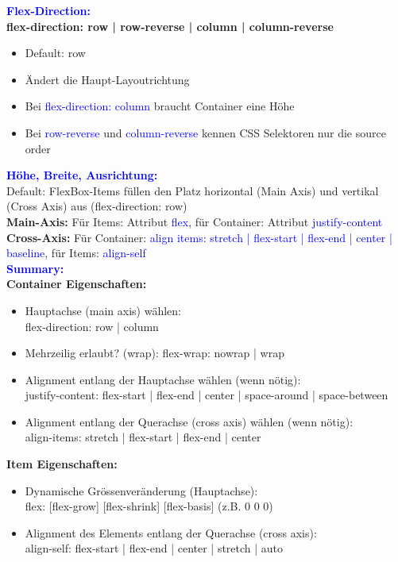 \textbf{\textcolor{blue}{Flex-Direction:}}\\
\textbf{flex-direction: row | row-reverse | column | column-reverse}
\begin{itemize}[topsep=0pt, leftmargin=3mm]
    \setlength\itemsep{-0.3em}
    \item Default: row
    \item Ändert die Haupt-Layoutrichtung
    \item Bei \textcolor{blue}{flex-direction: column} braucht Container eine Höhe
    \item Bei \textcolor{blue}{row-reverse} und \textcolor{blue}{column-reverse} kennen CSS Selektoren nur die source order
\end{itemize}
\textbf{\textcolor{blue}{Höhe, Breite, Ausrichtung:}}\\
Default: FlexBox-Items füllen den Platz horizontal (Main Axis) und vertikal (Cross Axis) aus (flex-direction: row)\\
\textbf{Main-Axis:} Für Items: Attribut \textcolor{blue}{flex}, für Container: Attribut \textcolor{blue}{justify-content}\\
\textbf{Cross-Axis:} Für Container: \textcolor{blue}{align items: stretch | flex-start | flex-end | center | baseline}, für Items: \textcolor{blue}{align-self}\\
\textbf{\textcolor{blue}{Summary:}}\\
\textbf{Container Eigenschaften:}
\begin{itemize}[topsep=0pt, leftmargin=3mm]
    \setlength\itemsep{-0.3em}
    \item Hauptachse (main axis) wählen:\\
    flex-direction: row | column
    \item Mehrzeilig erlaubt? (wrap):
    flex-wrap: nowrap | wrap\\
    \item Alignment entlang der Hauptachse wählen (wenn nötig):\\
    justify-content: flex-start | flex-end | center | space-around | space-between
    \item Alignment entlang der Querachse (cross axis) wählen (wenn nötig):\\
    align-items: stretch | flex-start | flex-end | center
\end{itemize}
\textbf{Item Eigenschaften:}
\begin{itemize}[topsep=0pt, leftmargin=3mm]
    \setlength\itemsep{-0.3em}
    \item Dynamische Grössenveränderung (Hauptachse):\\
    flex: [flex-grow] [flex-shrink] [flex-basis] (z.B. 0 0 0)
    \item Alignment des Elements entlang der Querachse (cross axis):\\
    align-self: flex-start | flex-end | center | stretch | auto
\end{itemize}
